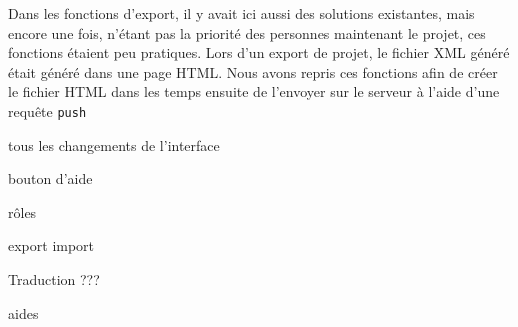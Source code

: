 Dans les fonctions d'export, il y avait ici aussi des solutions existantes, mais encore une fois, n'étant pas la priorité des personnes maintenant le projet, ces fonctions étaient peu pratiques. Lors d'un export de projet, le fichier XML généré était généré dans une page HTML. Nous avons repris ces fonctions afin de créer le fichier HTML dans les temps ensuite de l'envoyer sur le serveur à l'aide d'une requête \texttt{push}

tous les changements de l'interface

bouton d'aide

rôles

export import

Traduction ???

aides
